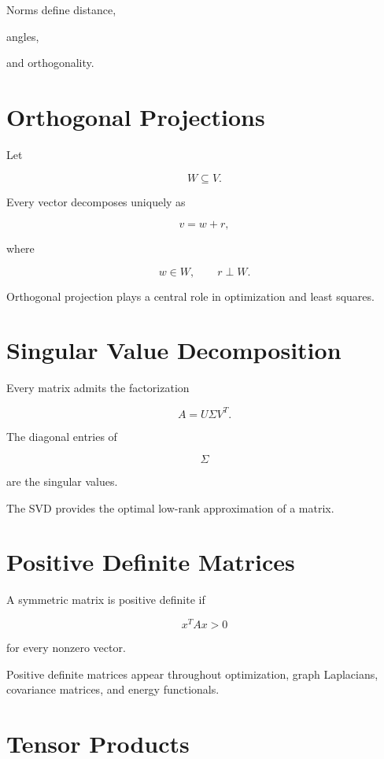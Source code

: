 \documentclass[11pt,fleqn]{book}
\numberwithin{equation}{chapter}
\theoremstyle{plain}
\theoremstyle{definition}
\theoremstyle{remark}
\begin{document}
Norms define distance,

angles,

and orthogonality.


\section{Orthogonal Projections}

Let

\[
W
\subseteq
V.
\]

Every vector decomposes uniquely as

\[
v
=
w+r,
\]

where

\[
w\in W,
\qquad
r\perp W.
\]

Orthogonal projection plays a central role in optimization and least
squares.


\section{Singular Value Decomposition}

Every matrix admits the factorization

\[
A
=
U\Sigma V^T.
\]

The diagonal entries of

\[
\Sigma
\]

are the singular values.

The SVD provides the optimal low-rank approximation of a matrix.


\section{Positive Definite Matrices}

A symmetric matrix is positive definite if

\[
x^TAx>0
\]

for every nonzero vector.

Positive definite matrices appear throughout optimization, graph
Laplacians, covariance matrices, and energy functionals.


\section{Tensor Products}
\end{document}
